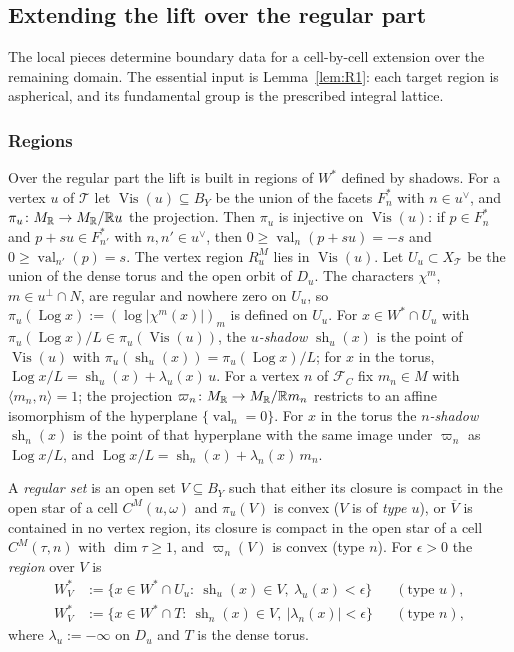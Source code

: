 \subsection{Extending the lift over the regular part}\label{ssec:lift-regular}

The local pieces determine boundary data for a cell-by-cell extension over the remaining domain.
The essential input is Lemma~\ref{lem:R1}: each target region is aspherical, and its fundamental group is the prescribed integral lattice.

\subsubsection*{Regions}
Over the regular part the lift is built in regions of $W^*$ defined by shadows. For a vertex $u$ of $\mathcal T$ let
$\operatorname{Vis}(u)\subseteq B_Y$ be the union of the facets $F^*_n$ with $n\in u^\vee$, and $\pi_u\colon M_\mathbb R\to
M_\mathbb R/\mathbb R u$ the projection. Then $\pi_u$ is injective on $\operatorname{Vis}(u)$: if $p\in F^*_n$ and $p+su\in F^*_{n'}$ with
$n,n'\in u^\vee$, then $0\ge\operatorname{val}_n(p+su)=-s$ and $0\ge\operatorname{val}_{n'}(p)=s$. The vertex region $R^M_u$
lies in $\operatorname{Vis}(u)$. Let $U_u\subset X_{\mathcal T}$ be the union of the dense torus and the open orbit of $D_u$.
The characters $\chi^m$, $m\in u^\perp\cap N$, are regular and nowhere zero on $U_u$, so $\pi_u(\operatorname{Log}x):=
(\log|\chi^m(x)|)_m$ is defined on $U_u$. For $x\in W^*\cap U_u$ with $\pi_u(\operatorname{Log}x)/L\in\pi_u(\operatorname{Vis}
(u))$, the \emph{$u$-shadow} $\operatorname{sh}_u(x)$ is the point of $\operatorname{Vis}(u)$ with $\pi_u(\operatorname{sh}_u
(x))=\pi_u(\operatorname{Log}x)/L$; for $x$ in the torus, $\operatorname{Log}x/L=\operatorname{sh}_u(x)+\lambda_u(x)\,u$.
For a vertex $n$ of $\mathcal F_C$ fix $m_n\in M$ with $\langle m_n,n\rangle=1$; the projection $\varpi_n\colon M_\mathbb R\to M_\mathbb R/
\mathbb R m_n$ restricts to an affine isomorphism of the hyperplane $\{\operatorname{val}_n=0\}$. For $x$ in the torus the
\emph{$n$-shadow} $\operatorname{sh}_n(x)$ is the point of that hyperplane with the same image under $\varpi_n$ as
$\operatorname{Log}x/L$, and $\operatorname{Log}x/L=\operatorname{sh}_n(x)+\lambda_n(x)\,m_n$.

\begin{definition}[regions]\label{def:regionsB}
A \emph{regular set} is an open set $V\subseteq B_Y$ such that either its closure is compact in the open star of a cell
$C^M(u,\omega)$ and $\pi_u(V)$ is convex ($V$ is of \emph{type $u$}), or $\overline V$ is contained in no vertex region, its closure is
compact in the open star of a cell $C^M(\tau,n)$ with $\dim\tau\ge1$, and $\varpi_n(V)$ is convex (type $n$). For
$\epsilon>0$ the \emph{region} over $V$ is
\begin{align*}
W^*_V&:=\{x\in W^*\cap U_u:\ \operatorname{sh}_u(x)\in V,\ \lambda_u(x)<\epsilon\}&&(\text{type }u),\\
W^*_V&:=\{x\in W^*\cap T:\ \operatorname{sh}_n(x)\in V,\ |\lambda_n(x)|<\epsilon\}&&(\text{type }n),
\end{align*}
where $\lambda_u:=-\infty$ on $D_u$ and $T$ is the dense torus.
\end{definition}

